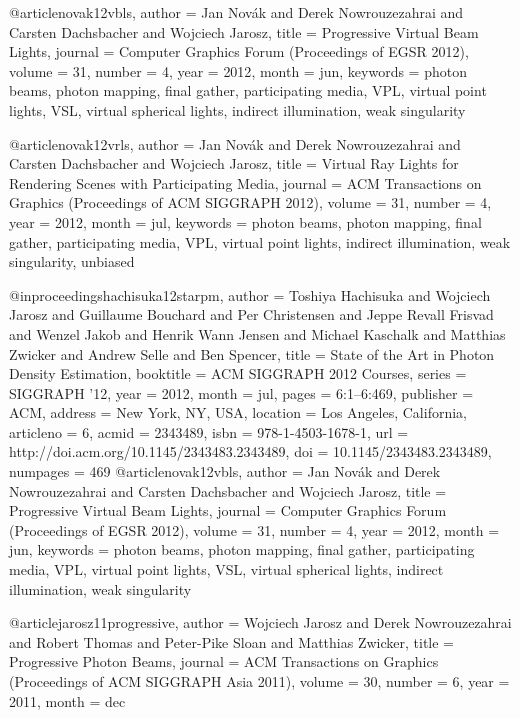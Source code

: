 

@article{novak12vbls,
    author = {Jan Nov{\'a}k and Derek Nowrouzezahrai and Carsten Dachsbacher and Wojciech Jarosz},
    title = {Progressive Virtual Beam Lights},
    journal = {Computer Graphics Forum (Proceedings of EGSR 2012)},
    volume = {31},
    number = {4},
    year = {2012},
    month = jun,
    keywords = {photon beams, photon mapping, final gather, participating media, VPL, virtual point lights, VSL, virtual spherical lights, indirect illumination, weak singularity}
}

@article{novak12vrls,
    author = {Jan Nov{\'a}k and Derek Nowrouzezahrai and Carsten Dachsbacher and Wojciech Jarosz},
    title = {Virtual Ray Lights for Rendering Scenes with Participating Media},
    journal = {ACM Transactions on Graphics (Proceedings of ACM SIGGRAPH 2012)},
    volume = {31},
    number = {4},
    year = {2012},
    month = jul,
    keywords = {photon beams, photon mapping, final gather, participating media, VPL, virtual point lights, indirect illumination, weak singularity, unbiased}
}

@inproceedings{hachisuka12starpm,
    author = {Toshiya Hachisuka and Wojciech Jarosz and Guillaume Bouchard and Per Christensen and Jeppe Revall Frisvad and Wenzel Jakob and Henrik Wann Jensen and Michael Kaschalk and Matthias Zwicker and Andrew Selle and Ben Spencer},
    title = {State of the Art in Photon Density Estimation},
    booktitle = {ACM SIGGRAPH 2012 Courses},
    series = {SIGGRAPH '12},
    year = {2012},
    month = jul,
    pages = {6:1--6:469},
    publisher = {ACM},
    address = {New York, NY, USA},
    location = {Los Angeles, California},
    articleno = {6},
    acmid = {2343489},
    isbn = {978-1-4503-1678-1},
    url = {http://doi.acm.org/10.1145/2343483.2343489},
    doi = {10.1145/2343483.2343489},
    numpages = {469}
}
@article{novak12vbls,
    author = {Jan Nov{\'a}k and Derek Nowrouzezahrai and Carsten Dachsbacher and Wojciech Jarosz},
    title = {Progressive Virtual Beam Lights},
    journal = {Computer Graphics Forum (Proceedings of EGSR 2012)},
    volume = {31},
    number = {4},
    year = {2012},
    month = jun,
    keywords = {photon beams, photon mapping, final gather, participating media, VPL, virtual point lights, VSL, virtual spherical lights, indirect illumination, weak singularity}
}

@article{jarosz11progressive,
    author = {Wojciech Jarosz and Derek Nowrouzezahrai and Robert Thomas and Peter-Pike Sloan and Matthias Zwicker},
    title = {Progressive Photon Beams},
    journal = {ACM Transactions on Graphics (Proceedings of ACM SIGGRAPH Asia 2011)},
    volume = {30},
    number = {6},
    year = {2011},
    month = dec
}

